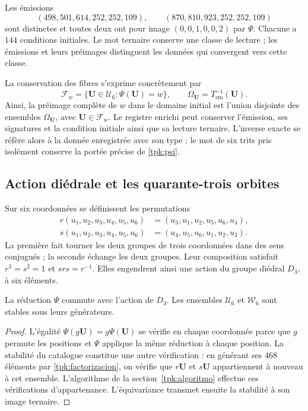 \begin{ejemplo}
\label{tpk:colision}
Les émissions
\[
 (498,501,614,252,252,109),\qquad
 (870,810,923,252,252,109)
\]
sont distinctes et toutes deux ont pour image \((0,0,1,0,0,2)\) par \(\Psi\).
Chacune a \(144\) conditions initiales. Le mot ternaire conserve
une classe de lecture ; les émissions et leurs préimages distinguent les données
qui convergent vers cette classe.
\end{ejemplo}

La conservation des fibres s'exprime concrètement par
\[
 \mathcal F_w=\{\mathbf U\in\mathcal U_6:\Psi(\mathbf U)=w\},
 \qquad
 \Omega_{\mathbf U}=T_{\mathrm{em}}^{-1}(\mathbf U).
\]
Ainsi, la préimage complète de \(w\) dans le domaine initial est l'union disjointe des ensembles \(\Omega_{\mathbf U}\), avec \(\mathbf U\in\mathcal F_w\). Le registre enrichi peut conserver l'émission, ses signatures et la condition initiale ainsi que sa lecture ternaire. L'inverse exacte se réfère alors à la donnée enregistrée avec son type ; le mot de six trits pris isolément conserve la portée précise de \eqref{tpk:psi}.

\subsection{Action diédrale et les quarante-trois orbites}
\label{tpk:orbitas}

Sur six coordonnées se définissent les permutations
\begin{align}
 r(u_1,u_2,u_3,u_4,u_5,u_6)
   &=(u_3,u_1,u_2,u_5,u_6,u_4),\\
 s(u_1,u_2,u_3,u_4,u_5,u_6)
   &=(u_4,u_5,u_6,u_1,u_2,u_3).
 \label{tpk:generadores-diedrales}
\end{align}
La première fait tourner les deux groupes de trois coordonnées dans des sens conjugués ;
la seconde échange les deux groupes. Leur composition satisfait
\(r^3=s^2=1\) et \(srs=r^{-1}\). Elles engendrent ainsi une action du groupe diédral
\(D_3\), à six éléments.

\begin{proposicion}
\label{tpk:equivarianza}
La réduction \(\Psi\) commute avec l'action de \(D_3\). Les ensembles
\(\mathcal U_6\) et \(\mathcal W_6\) sont stables sous leurs générateurs.
\end{proposicion}
\begin{proof}
L'égalité \(\Psi(g\mathbf U)=g\Psi(\mathbf U)\) se vérifie en chaque
coordonnée parce que \(g\) permute les positions et \(\Psi\) applique la même
réduction à chaque position. La stabilité du catalogue constitue une autre
vérification : en générant ses \(468\) éléments par
\eqref{tpk:factorizacion}, on vérifie que \(r\mathbf U\) et
\(s\mathbf U\) appartiennent à nouveau à cet ensemble. L'algorithme de la
section~\ref{tpk:algoritmo} effectue ces vérifications d'appartenance.
L'équivariance transmet ensuite la stabilité à son image ternaire.
\end{proof}

